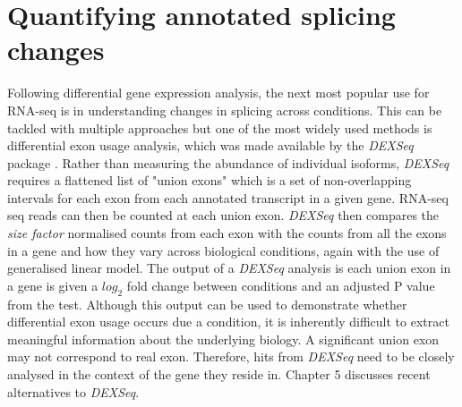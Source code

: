 
\section{Quantifying annotated splicing changes }
Following differential gene expression analysis, the next most popular use for RNA-seq is in understanding changes in splicing across conditions. This can be tackled with multiple approaches but one of the most widely used methods is differential exon usage analysis, which was made available by the \textit{DEXSeq} package \citep{Anders2012}. Rather than measuring the abundance of individual isoforms, \textit{DEXSeq} requires a flattened list of "union exons" which is a set of non-overlapping intervals for each exon from each annotated transcript in a given gene. RNA-seq seq reads can then be counted at each union exon. \textit{DEXSeq} then compares the \textit{size factor} normalised counts from each exon with the counts from all the exons in a gene and how they vary across biological conditions, again with the use of generalised linear model. 
The output of a \textit{DEXSeq} analysis is each union exon in a gene is given a $log_2$ fold change between conditions and an adjusted P value from the test. Although this output can be used to demonstrate whether differential exon usage occurs due a condition, it is inherently difficult to extract meaningful information about the underlying biology. A significant union exon may not correspond to real exon. Therefore, hits from \textit{DEXSeq} need to be closely analysed in the context of the gene they reside in. Chapter 5 discusses recent alternatives to \textit{DEXSeq}. 



